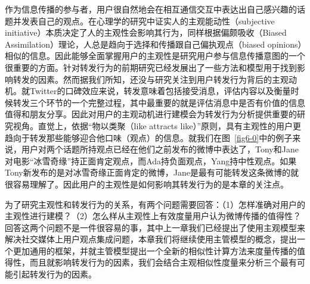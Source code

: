 作为信息传播的参与者，用户很自然地会在相互通信交互中表达出自己感兴趣的话题并发表自己的观点。在心理学的研究中证实人的主观能动性（subjective initiative）本质决定了人的主观性会影响其行为，同样根据偏颇吸收（Biased Assimilation）理论，人总是趋向于选择和传播跟自己偏执观点（biased opinions）相似的信息。因此能够全面掌握用户的主观性是研究用户参与信息传播意图的一个很重要的方面。针对转发行为的前期研究已经发展出了一些方法和模型用于找到影响转发的因素。然而据我们所知，还没与研究关注到用户转发行为背后的主观动机。就Twitter的口碑效应来说，转发意味着包括接受消息，评估内容以及衡量时候转发三个环节的一个完整过程，其中最重要的就是评估消息中是否有价值的信息值得和朋友分享。因此对用户的主观动机进行建模会为转发行为分析提供重要的研究视角。直觉上，依据“物以类聚（like attracts like）”原则，具有主观性的用户更趋向于转发那些能够迎合他口味（观点）的信息。就我们在图~\ref{fig6-0}中的例子来说，用户对两个话题所持观点已经在他们之前发布的微博中表达了，Tony和Jane对电影“冰雪奇缘”持正面肯定观点，而Ada持负面观点，Yang持中性观点。如果Tony新发布的是对冰雪奇缘正面肯定的微博，Jane是最有可能转发这条微博的就很容易理解了。因此用户的主观性是如何影响其转发行为的是本章的关注点。

为了研究主观性和转发行为的关系，有两个问题需要回答：（1）怎样准确对用户的主观性进行建模？（2）怎么样从主观性上有效度量用户认为微博传播的值得性？
回答这两个问题不是一件很容易的事，其中上一章我们已经提出了使用主观模型来解决社交媒体上用户观点集成问题，本章我们将继续使用主管模型的概念，提出一个更加通用的框架，并就主管模型提出一个全新的相似性计算方法来度量传播的值得性，而且就影响转发行为的因素，我们会结合主观相似性度量来分析三个最有可能引起转发行为的因素。

